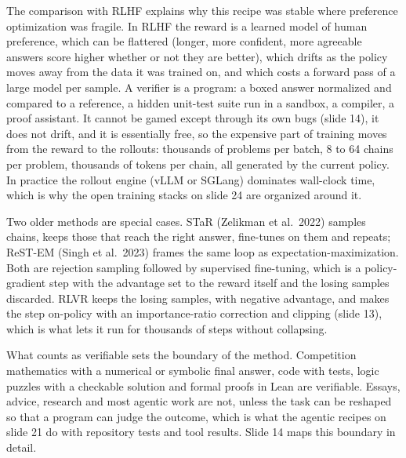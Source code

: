 \documentclass[11pt,letterpaper]{article}
\begin{document}
The comparison with RLHF explains why this recipe was stable where preference optimization was fragile. In RLHF the reward is a learned model of human preference, which can be flattered (longer, more confident, more agreeable answers score higher whether or not they are better), which drifts as the policy moves away from the data it was trained on, and which costs a forward pass of a large model per sample. A verifier is a program: a boxed answer normalized and compared to a reference, a hidden unit-test suite run in a sandbox, a compiler, a proof assistant. It cannot be gamed except through its own bugs (slide 14), it does not drift, and it is essentially free, so the expensive part of training moves from the reward to the rollouts: thousands of problems per batch, 8 to 64 chains per problem, thousands of tokens per chain, all generated by the current policy. In practice the rollout engine (vLLM or SGLang) dominates wall-clock time, which is why the open training stacks on slide 24 are organized around it.

Two older methods are special cases. STaR (Zelikman et al.\ 2022) samples chains, keeps those that reach the right answer, fine-tunes on them and repeats; ReST-EM (Singh et al.\ 2023) frames the same loop as expectation-maximization. Both are rejection sampling followed by supervised fine-tuning, which is a policy-gradient step with the advantage set to the reward itself and the losing samples discarded. RLVR keeps the losing samples, with negative advantage, and makes the step on-policy with an importance-ratio correction and clipping (slide 13), which is what lets it run for thousands of steps without collapsing.

What counts as verifiable sets the boundary of the method. Competition mathematics with a numerical or symbolic final answer, code with tests, logic puzzles with a checkable solution and formal proofs in Lean are verifiable. Essays, advice, research and most agentic work are not, unless the task can be reshaped so that a program can judge the outcome, which is what the agentic recipes on slide 21 do with repository tests and tool results. Slide 14 maps this boundary in detail.
\end{document}
